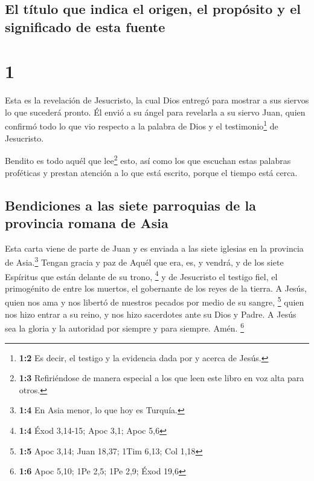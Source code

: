 \hypertarget{el-tuxedtulo-que-indica-el-origen-el-propuxf3sito-y-el-significado-de-esta-fuente}{%
\subsection{El título que indica el origen, el propósito y el
significado de esta
fuente}\label{el-tuxedtulo-que-indica-el-origen-el-propuxf3sito-y-el-significado-de-esta-fuente}}

\hypertarget{section}{%
\section{1}\label{section}}

 Esta es la revelación de Jesucristo, la cual Dios entregó
para mostrar a sus siervos lo que sucederá pronto. Él envió a su ángel
para revelarla a su siervo Juan,  quien confirmó todo lo
que vio respecto a la palabra de Dios y el testimonio\footnote{\textbf{1:2}
  Es decir, el testigo y la evidencia dada por y acerca de Jesús.} de
Jesucristo.

 Bendito es todo aquél que lee\footnote{\textbf{1:3}
  Refiriéndose de manera especial a los que leen este libro en voz alta
  para otros.} esto, así como los que escuchan estas palabras proféticas
y prestan atención a lo que está escrito, porque el tiempo está cerca.

\hypertarget{bendiciones-a-las-siete-parroquias-de-la-provincia-romana-de-asia}{%
\subsection{Bendiciones a las siete parroquias de la provincia romana de
Asia}\label{bendiciones-a-las-siete-parroquias-de-la-provincia-romana-de-asia}}

 Esta carta viene de parte de Juan y es enviada a las
siete iglesias en la provincia de Asia.\footnote{\textbf{1:4} En Asia
  menor, lo que hoy es Turquía.} Tengan gracia y paz de Aquél que era,
es, y vendrá, y de los siete Espíritus que están delante de su trono,
\footnote{\textbf{1:4} Éxod 3,14-15; Apoc 3,1; Apoc 5,6} 
y de Jesucristo el testigo fiel, el primogénito de entre los muertos, el
gobernante de los reyes de la tierra. A Jesús, quien nos ama y nos
libertó de nuestros pecados por medio de su sangre, \footnote{\textbf{1:5}
  Apoc 3,14; Juan 18,37; 1Tim 6,13; Col 1,18}  quien nos
hizo entrar a su reino, y nos hizo sacerdotes ante su Dios y Padre. A
Jesús sea la gloria y la autoridad por siempre y para siempre. Amén.
\footnote{\textbf{1:6} Apoc 5,10; 1Pe 2,5; 1Pe 2,9; Éxod 19,6}

